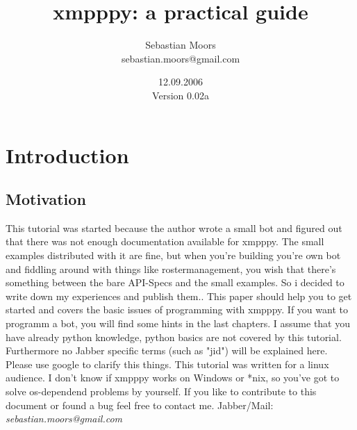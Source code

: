 \documentclass[a4paper,10pt]{report}
\title{xmpppy: a practical guide}
\author{Sebastian Moors \\ sebastian.moors@gmail.com}
\date{12.09.2006 \\[1cm] Version 0.02a}
\begin{document}
\begin{titlepage}
\maketitle


\end{titlepage}
\tableofcontents
\newpage




\chapter{Introduction}
\section{Motivation}
This tutorial was started because the author wrote a small bot and figured out that there was not enough documentation available for xmpppy. The small examples distributed with it are fine, but when you're building you're own bot and fiddling around with things like rostermanagement, you wish that there's something between the bare API-Specs and the small examples. So i decided to write down my experiences and publish them..
\newline
This paper should help you to get started and covers the basic issues of programming with xmpppy.
If you want to programm a bot, you will find some hints in the last chapters.
I assume that you have already python knowledge, python basics are not covered by this tutorial.
\newline
\newline
Furthermore no Jabber specific terms (such as "jid") will be explained here. Please use google to clarify this things.
\newline
\newline
This tutorial was written for a linux audience. I don't know if xmpppy works on Windows or *nix, so you've got to solve os-dependend problems by yourself.
\newline
\newline
If you like to contribute to this document or found a bug feel free to contact me.
\newline
\newline Jabber/Mail: \textit{sebastian.moors@gmail.com}
\end{document}
